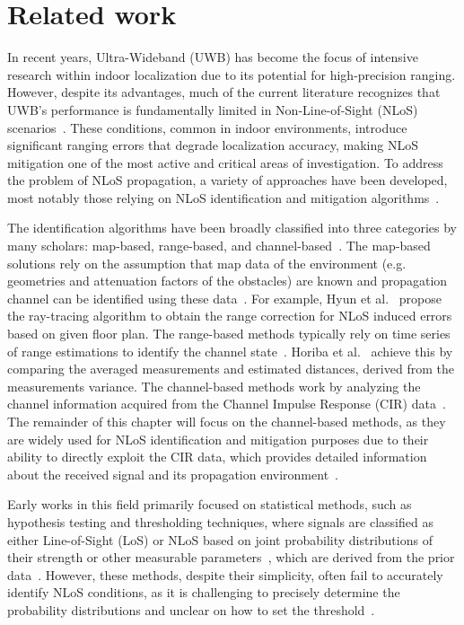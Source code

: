 \chapter{Related work}\label{related_work}

In recent years, Ultra-Wideband (UWB) has become the focus of intensive research within indoor localization due to its potential for high-precision ranging. However, despite its advantages, much of the current literature recognizes that UWB’s performance is fundamentally limited in Non-Line-of-Sight (NLoS) scenarios~\cite{Elikplim2024survey}. These conditions, common in indoor environments, introduce significant ranging errors that degrade localization accuracy, making NLoS mitigation one of the most active and critical areas of investigation. To address the problem of NLoS propagation, a variety of approaches have been developed, most notably those relying on NLoS identification and mitigation algorithms~\cite{Wang2023NLoS}. 

The identification algorithms have been broadly classified into three categories by many scholars: map-based, range-based, and channel-based~\cite{khodjaev2010survey}. The map-based solutions rely on the assumption that map data of the environment (e.g. geometries and attenuation factors of the obstacles) are known and propagation channel can be identified using these data~\cite{khodjaev2010survey}. For example, Hyun et al.~\cite{hyun2019uwb} propose the ray-tracing algorithm to obtain the range correction for NLoS induced errors based on given floor plan. The range-based methods typically rely on time series of range estimations to identify the channel state~\cite{khodjaev2010survey}. Horiba et al.~\cite{horiba2015improved} achieve this by comparing the averaged measurements and estimated distances, derived from the measurements variance. The channel-based methods work by analyzing the channel information acquired from the Channel Impulse Response (CIR) data~\cite{khodjaev2010survey, marano2010nlos}. The remainder of this chapter will focus on the channel-based methods, as they are widely used for NLoS identification and mitigation purposes due to their ability to directly exploit the CIR data, which provides detailed information about the received signal and its propagation environment~\cite{Lee2023CIR, pei2024fcn}.

Early works in this field primarily focused on statistical methods, such as hypothesis testing and thresholding techniques, where signals are classified as either Line-of-Sight (LoS) or NLoS based on joint probability distributions of their strength or other measurable parameters~\cite{venkatesh2007non}, which are derived from the prior data~\cite{schroeder2007nlos}. However, these methods, despite their simplicity, often fail to accurately identify NLoS conditions, as it is challenging to precisely determine the probability distributions and unclear on how to set the threshold~\cite{shi2014rss}.


